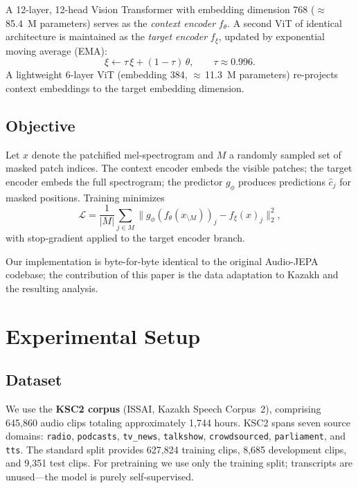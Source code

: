\documentclass[conference]{IEEEtran}
\begin{document}
A 12-layer, 12-head Vision Transformer with embedding dimension 768 ($\approx$\,85.4~M parameters) serves as the \emph{context encoder} $f_\theta$. A second ViT of identical architecture is maintained as the \emph{target encoder} $f_\xi$, updated by exponential moving average (EMA):
\begin{equation}
\xi \leftarrow \tau\,\xi + (1-\tau)\,\theta,\qquad \tau \approx 0.996.
\end{equation}
A lightweight 6-layer ViT (embedding 384, $\approx$\,11.3~M parameters) re-projects context embeddings to the target embedding dimension.

\subsection{Objective}

Let $x$ denote the patchified mel-spectrogram and $M$ a randomly sampled set of masked patch indices. The context encoder embeds the visible patches; the target encoder embeds the full spectrogram; the predictor $g_\phi$ produces predictions $\hat{c}_j$ for masked positions. Training minimizes
\begin{equation}
\mathcal{L} = \frac{1}{|M|}\sum_{j \in M} \bigl\| g_\phi(f_\theta(x_{\setminus M}))_j - f_\xi(x)_j \bigr\|_2^2,
\end{equation}
with stop-gradient applied to the target encoder branch.

Our implementation is byte-for-byte identical to the original Audio-JEPA codebase; the contribution of this paper is the data adaptation to Kazakh and the resulting analysis.

\section{Experimental Setup}

\subsection{Dataset}

We use the \textbf{KSC2 corpus} (ISSAI, Kazakh Speech Corpus~2), comprising 645{,}860 audio clips totaling approximately 1{,}744 hours. KSC2 spans seven source domains: \texttt{radio}, \texttt{podcasts}, \texttt{tv\_news}, \texttt{talkshow}, \texttt{crowdsourced}, \texttt{parliament}, and \texttt{tts}. The standard split provides 627{,}824 training clips, 8{,}685 development clips, and 9{,}351 test clips. For pretraining we use only the training split; transcripts are unused---the model is purely self-supervised.
\end{document}
